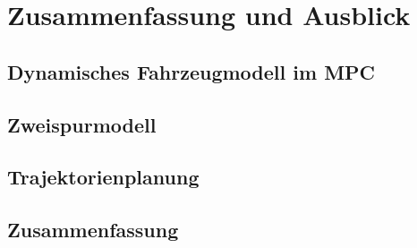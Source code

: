 \documentclass{like}
\begin{document}
\chapter[Ausblick]{Zusammenfassung und Ausblick}
\section{Dynamisches Fahrzeugmodell im MPC}
\section{Zweispurmodell}
\section{Trajektorienplanung}

\section{Zusammenfassung}



\appendix





%



%


\end{document}
